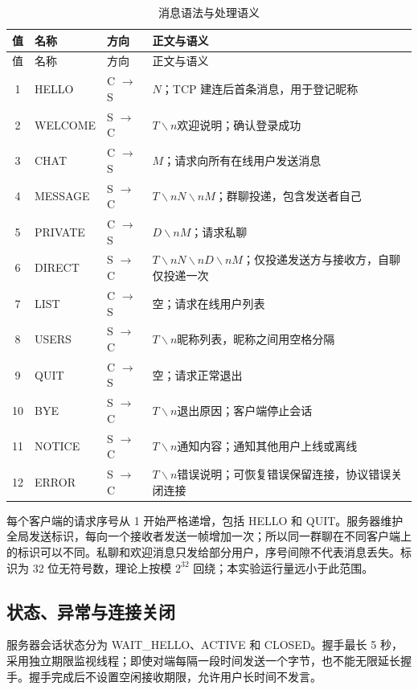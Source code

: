\documentclass[UTF8,notitlepage,11pt]{ctexart}
\begin{document}
\begin{longtable}{c p{} p{} p{}}
\caption{消息语法与处理语义}\\\toprule
值 & 名称 & 方向 & 正文与语义\\\midrule\endfirsthead
\toprule 值 & 名称 & 方向 & 正文与语义\\\midrule\endhead
1 & HELLO & C $\to$ S & $N$；TCP 建连后首条消息，用于登记昵称\\
2 & WELCOME & S $\to$ C & $T\backslash n$欢迎说明；确认登录成功\\
3 & CHAT & C $\to$ S & $M$；请求向所有在线用户发送消息\\
4 & MESSAGE & S $\to$ C & $T\backslash nN\backslash nM$；群聊投递，包含发送者自己\\
5 & PRIVATE & C $\to$ S & $D\backslash nM$；请求私聊\\
6 & DIRECT & S $\to$ C & $T\backslash nN\backslash nD\backslash nM$；仅投递发送方与接收方，自聊仅投递一次\\
7 & LIST & C $\to$ S & 空；请求在线用户列表\\
8 & USERS & S $\to$ C & $T\backslash n$昵称列表，昵称之间用空格分隔\\
9 & QUIT & C $\to$ S & 空；请求正常退出\\
10 & BYE & S $\to$ C & $T\backslash n$退出原因；客户端停止会话\\
11 & NOTICE & S $\to$ C & $T\backslash n$通知内容；通知其他用户上线或离线\\
12 & ERROR & S $\to$ C & $T\backslash n$错误说明；可恢复错误保留连接，协议错误关闭连接\\\bottomrule
\end{longtable}

每个客户端的请求序号从 1 开始严格递增，包括 HELLO 和 QUIT。服务器维护全局发送标识，每向一个接收者发送一帧增加一次；所以同一群聊在不同客户端上的标识可以不同。私聊和欢迎消息只发给部分用户，序号间隙不代表消息丢失。标识为 32 位无符号数，理论上按模 $2^{32}$ 回绕；本实验运行量远小于此范围。

\subsection{状态、异常与连接关闭}
服务器会话状态分为 WAIT\_HELLO、ACTIVE 和 CLOSED。握手最长 5 秒，采用独立期限监视线程；即使对端每隔一段时间发送一个字节，也不能无限延长握手。握手完成后不设置空闲接收期限，允许用户长时间不发言。
\end{document}
